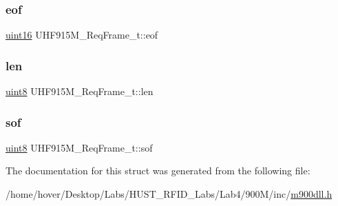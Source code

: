\mbox{\label{struct_u_h_f915_m___req_frame__t_afa020a84121162bd5b9d5ad2fa351345}} 
\subsubsection{\texorpdfstring{eof}{eof}}
{\footnotesize\ttfamily \mbox{\hyperlink{m900dll_8h_a05f6b0ae8f6a6e135b0e290c25fe0e4e}{uint16}} U\+H\+F915\+M\+\_\+\+Req\+Frame\+\_\+t\+::eof}

\mbox{\label{struct_u_h_f915_m___req_frame__t_a977a9fcf3871acb4dc7e99dc0c740010}} 
\subsubsection{\texorpdfstring{len}{len}}
{\footnotesize\ttfamily \mbox{\hyperlink{m900dll_8h_adde6aaee8457bee49c2a92621fe22b79}{uint8}} U\+H\+F915\+M\+\_\+\+Req\+Frame\+\_\+t\+::len}

\mbox{\label{struct_u_h_f915_m___req_frame__t_a5cd3171065060dd03f20d0f11039036e}} 
\subsubsection{\texorpdfstring{sof}{sof}}
{\footnotesize\ttfamily \mbox{\hyperlink{m900dll_8h_adde6aaee8457bee49c2a92621fe22b79}{uint8}} U\+H\+F915\+M\+\_\+\+Req\+Frame\+\_\+t\+::sof}



The documentation for this struct was generated from the following file\+:\begin{DoxyCompactItemize}
\item 
/home/hover/\+Desktop/\+Labs/\+H\+U\+S\+T\+\_\+\+R\+F\+I\+D\+\_\+\+Labs/\+Lab4/900\+M/inc/\mbox{\hyperlink{m900dll_8h}{m900dll.\+h}}\end{DoxyCompactItemize}
